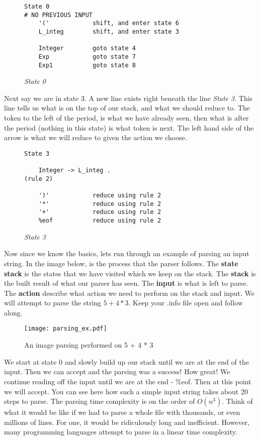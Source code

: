 \documentclass{article}
\begin{document}
\begin{figure}[H]
    \begin{lstlisting}
State 0
# NO PREVIOUS INPUT
	'('            shift, and enter state 6
	L_integ        shift, and enter state 3

	Integer        goto state 4
	Exp            goto state 7
	Exp1           goto state 8
    \end{lstlisting}
    \caption{\textit{State 0}}
\end{figure}

Next say we are in state 3. A new line exists right beneath the line \textit{State 3}. This line tells us what is on the top of our stack, and what we should reduce to. The token to the left of the period, is what we have already seen, then what is after the period (nothing in this state) is what token is next. The left hand side of the arrow is what we will reduce to given the action we choose. 

\begin{figure}[H]
    \begin{lstlisting}
State 3

	Integer -> L_integ .                                (rule 2)

	')'            reduce using rule 2
	'*'            reduce using rule 2
	'+'            reduce using rule 2
	%eof           reduce using rule 2
    \end{lstlisting}
    \caption{\textit{State 3}}
\end{figure}

\medskip\noindent
Now since we know the basics, lets run through an example of parsing an input string. In the image below, is the process that the parser follows. The \textbf{state stack} is the states that we have visited which we keep on the stack. The \textbf{stack} is the built result of what our parser has seen. The \textbf{input} is what is left to parse. The \textbf{action} describe what action we need to perform on the stack and input. We will attempt to parse the string $5 + 4 * 3$. Keep your .info file open and follow along.


\begin{figure}[H]
    \centering
    \texttt{[image: parsing\_ex.pdf]}
    \caption{An image parsing performed on 5 + 4 * 3}
    \label{fig:parsing}
\end{figure}

\medskip\noindent
We start at state 0 and slowly build up our stack until we are at the end of the input. Then we can accept and the parsing was a success! How great! We continue reading off the input until we are at the end - \%eof. Then at this point we will accept. You can see here how such a simple input string takes about 20 steps to parse. The parsing time complexity is on the order of $O(n^3)$. Think of what it would be like if we had to parse a whole file with thousands, or even millions of lines. For one, it would be ridiculously long and inefficient. However, many programming languages attempt to parse in a linear time complexity\cite{IPL}. 
\end{document}
